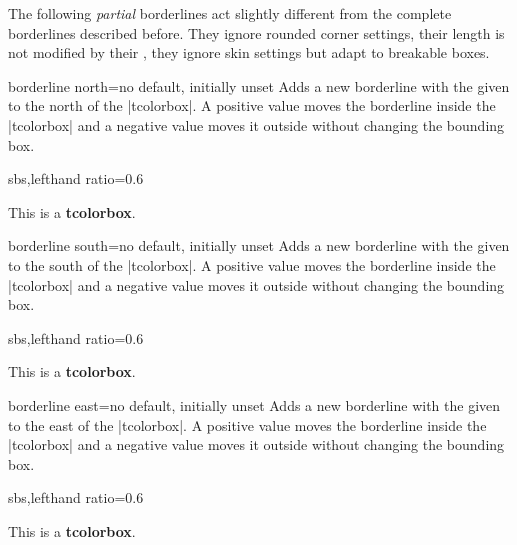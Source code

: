 \clearpage

\begin{marker}
The following \emph{partial} borderlines act slightly different from the
complete borderlines described before. They ignore rounded corner settings,
their length is not modified by their , they ignore skin settings
but adapt to breakable boxes.
\end{marker}

\begin{docTcbKey}[][doc new=2014-10-20]{borderline north}{=}{no default, initially unset}
  Adds a new borderline with the given  to the
  north of the |tcolorbox|.
  A positive  value
  moves the borderline inside the |tcolorbox| and a negative  value
  moves it outside without changing the bounding box.
\begin{dispExample*}{sbs,lefthand ratio=0.6}
\begin{tcolorbox}[enhanced,
  borderline north={2pt}{-2pt}{red}]
  This is a \textbf{tcolorbox}.
\end{tcolorbox}
\end{dispExample*}
\end{docTcbKey}

\begin{docTcbKey}[][doc new=2014-10-20]{borderline south}{=}{no default, initially unset}
  Adds a new borderline with the given  to the
  south of the |tcolorbox|.
  A positive  value
  moves the borderline inside the |tcolorbox| and a negative  value
  moves it outside without changing the bounding box.
\begin{dispExample*}{sbs,lefthand ratio=0.6}
\begin{tcolorbox}[enhanced,
  borderline south={2pt}{-2pt}{red}]
  This is a \textbf{tcolorbox}.
\end{tcolorbox}
\end{dispExample*}
\end{docTcbKey}

\begin{docTcbKey}[][doc new=2014-10-20]{borderline east}{=}{no default, initially unset}
  Adds a new borderline with the given  to the
  east of the |tcolorbox|.
  A positive  value
  moves the borderline inside the |tcolorbox| and a negative  value
  moves it outside without changing the bounding box.
\begin{dispExample*}{sbs,lefthand ratio=0.6}
\begin{tcolorbox}[enhanced,
  borderline east={2pt}{-2pt}{red}]
  This is a \textbf{tcolorbox}.
\end{tcolorbox}
\end{dispExample*}
\end{docTcbKey}

